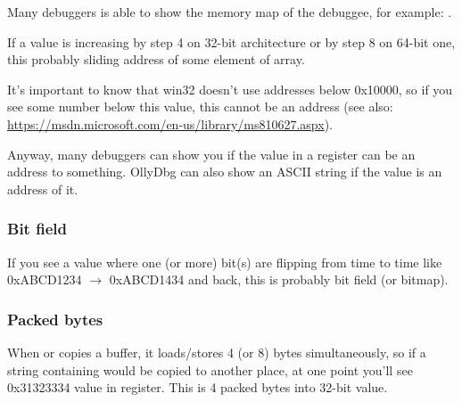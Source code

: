 Many debuggers is able to show the memory map of the debuggee, for example: .

If a value is increasing by step 4 on 32-bit architecture or by step 8 on 64-bit one,
this probably sliding address of some element of array.

It's important to know that win32 doesn't use addresses below 0x10000, so if you see some number below this value,
this cannot be an address (see also: \url{https://msdn.microsoft.com/en-us/library/ms810627.aspx}).

Anyway, many debuggers can show you if the value in a register can be an address to something.
OllyDbg can also show an ASCII string if the value is an address of it.

\subsubsection{Bit field}

If you see a value where one (or more) bit(s) are flipping from time to time like 0xABCD1234 $\rightarrow$ 0xABCD1434 and back,
this is probably bit field (or bitmap).

\subsubsection{Packed bytes}

When  or  copies a buffer, it loads/stores 4 (or 8) bytes simultaneously,
so if a string containing  would be copied to another place,
at one point you'll see 0x31323334 value in register.
This is 4 packed bytes into 32-bit value.

